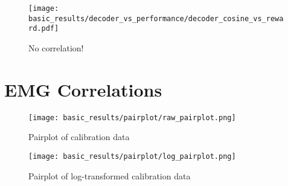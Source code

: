 \documentclass[../main.tex]{subfiles}
\begin{document}
\begin{figure}[H]
    \centering
    \texttt{[image: basic\_results/decoder\_vs\_performance/decoder\_cosine\_vs\_reward.pdf]}
    \caption[Decoder axis similarity versus reward]{No correlation!}\label{fig:decoder_cosine_vs_reward}
\end{figure}







\section{EMG Correlations}

\begin{figure}[H]
    \centering
    \texttt{[image: basic\_results/pairplot/raw\_pairplot.png]}
    \caption[Pairplot of calibration data]{Pairplot of calibration data}\label{fig:raw_pairplot}
\end{figure}

\begin{figure}[H]
    \centering
    \texttt{[image: basic\_results/pairplot/log\_pairplot.png]}
    \caption[Pairplot of log-transformed calibration data]{Pairplot of log-transformed calibration data}\label{fig:log_pairplot}
\end{figure}


\end{document}
